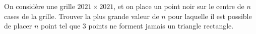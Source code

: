 On considère une grille $2021\times 2021$, et on place un point noir sur le centre de $n$ cases de la grille. Trouver la plus grande valeur de $n$ pour laquelle il est possible de placer $n$ point tel que $3$ points ne forment jamais un triangle rectangle.